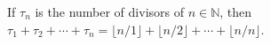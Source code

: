 If $\tau_n$ is the number of divisors of $n \in \mathbb{N}$, then $\tau_1 + \tau_2 + \cdots + \tau_n = \lfloor n/1 \rfloor + \lfloor n/2 \rfloor + \cdots + \lfloor n/n \rfloor$.
